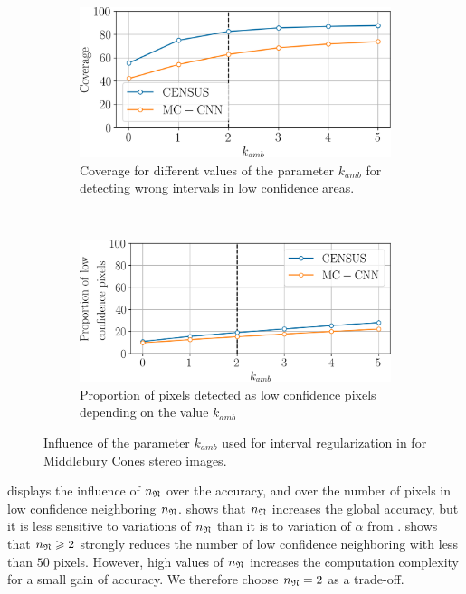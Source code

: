 \begin{figure}
    \centering
    \begin{subfigure}[t]{0.7\linewidth}
        \centering
        \includegraphics[width=\linewidth]{Images/X_Annex/ablation_study_cones_k_amb.png}
        \caption{Coverage for different values of the parameter $k_{amb}$ for detecting wrong intervals in low confidence areas.}
        \label{fig:ablation_study_k_coverage}
    \end{subfigure}\vspace*{0.3cm}\\
    \begin{subfigure}[t]{0.7\linewidth}
        \centering
        \includegraphics[width=\linewidth]{Images/X_Annex/ablation_study_cones_k_amb_2.png}
        \caption{Proportion of pixels detected as low confidence pixels depending on the value $k_{amb}$}
        \label{fig:ablation_study_k_size}
    \end{subfigure}
    \caption{Influence of the parameter $k_{amb}$ used for interval regularization in  for Middlebury Cones stereo images.}
    \label{fig:ablation_study_k}
\end{figure}

 displays the influence of $n_{\mathfrak{N}}$ over the accuracy, and over the number of pixels in low confidence neighboring $n_{\mathfrak{N}}$.  shows that $n_{\mathfrak{N}}$ increases the global accuracy, but it is less sensitive to variations of $n_{\mathfrak{N}}$ than it is to variation of $\alpha$ from .  shows that $n_{\mathfrak{N}}\geqslant2$ strongly reduces the number of low confidence neighboring with less than $50$ pixels. However, high values of $n_{\mathfrak{N}}$ increases the computation complexity for a small gain of accuracy. We therefore choose $n_{\mathfrak{N}}=2$ as a trade-off.


